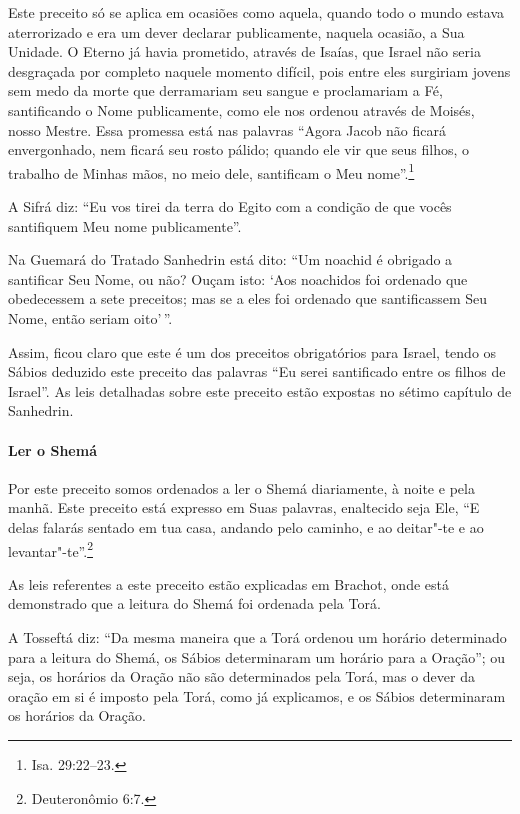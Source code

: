 \begin{multicols}{2}
Este preceito só se aplica em ocasiões como aquela, quando todo
o mundo estava aterrorizado e era um dever declarar publicamente,
naquela ocasião, a Sua Unidade. O Eterno já havia prometido, através de
Isaías, que Israel não seria desgraçada por completo naquele momento
difícil, pois entre eles surgiriam jovens sem medo da morte que
derramariam seu sangue e proclamariam a Fé, santificando o Nome
publicamente, como ele nos ordenou através
de Moisés, nosso Mestre. Essa promessa está nas palavras ``Agora Jacob\starr{}
não ficará envergonhado, nem ficará seu rosto pálido; quando ele vir que seus
filhos, o
trabalho de Minhas mãos, no meio dele, santificam o Meu
nome''.\footnote{Isa. 29:22--23.}

A Sifrá\starr{} diz: ``Eu vos tirei da terra do Egito com a condição de que
vocês santifiquem Meu nome publicamente''.

Na Guemará\starr{} do Tratado Sanhedrin\starr{} está dito: ``Um noachid\starr{} é obrigado a
santificar Seu Nome, ou não? Ouçam isto: `Aos noachidos\starr{} foi ordenado que obedecessem a sete preceitos; mas se a eles foi ordenado que
santificassem Seu Nome, então seriam oito'\,''.

Assim, ficou claro que este é um dos preceitos obrigatórios para
Israel, tendo os Sábios deduzido este preceito das palavras ``Eu serei
santificado entre os filhos de Israel''. As leis detalhadas sobre este
preceito estão expostas no sétimo capítulo de Sanhedrin\starr.

\paragraph{Ler o Shemá\starr}

Por este preceito somos ordenados a ler o Shemá\starr{} diariamente, à noite e
pela manhã. Este preceito está expresso em Suas palavras, enaltecido
seja Ele, ``E delas falarás sentado em tua casa, andando pelo caminho, e
ao deitar"-te e ao levantar"-te''.\footnote{Deuteronômio 6:7.}

As leis referentes a este preceito estão explicadas em Brachot\starr, onde
está demonstrado que a leitura do Shemá\starr{} foi ordenada pela Torá\starr.

A Tosseftá\starr{} diz: ``Da mesma maneira que a Torá\starr{} ordenou um horário
determinado para a leitura do Shemá\starr, os Sábios determinaram um horário
para a Oração''; ou seja, os horários da Oração não são determinados
pela Torá\starr, mas o dever da oração em si é imposto pela Torá\starr, como já
explicamos, e os Sábios determinaram os horários da Oração.


\end{multicols}
